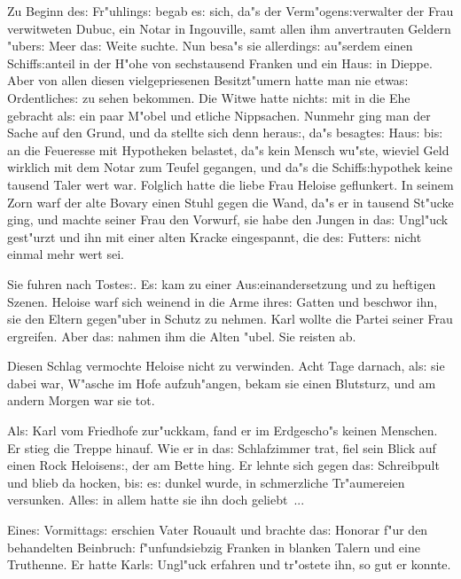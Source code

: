 \documentclass[oneside,12pt]{book}
\newcommand{\s}{s:}%
\begin{document}
Zu Beginn de{\s} Fr"uhling{\s} begab e{\s} sich, da"s der
Verm"ogen{\s}verwalter der Frau verwitweten Dubuc, ein Notar in
Ingouville, samt allen ihm anvertrauten Geldern "uber{\s} Meer
da{\s} Weite suchte. Nun besa"s sie allerding{\s} au"serdem einen
Schiff{\s}anteil in der H"ohe von sechstausend Franken und ein
Hau{\s} in Dieppe. Aber von allen diesen vielgepriesenen
Besitzt"umern hatte man nie etwa{\s} Ordentliche{\s} zu sehen
bekommen. Die Witwe hatte nicht{\s} mit in die Ehe gebracht al{\s}
ein paar M"obel und etliche Nippsachen. Nunmehr ging man der Sache
auf den Grund, und da stellte sich denn herau{\s}, da"s
besagte{\s} Hau{\s} bi{\s} an die Feueresse mit Hypotheken
belastet, da"s kein Mensch wu"ste, wieviel Geld wirklich mit dem
Notar zum Teufel gegangen, und da"s die Schiff{\s}hypothek keine
tausend Taler wert war. Folglich hatte die liebe Frau Heloise
geflunkert. In seinem Zorn warf der alte Bovary einen Stuhl gegen
die Wand, da"s er in tausend St"ucke ging, und machte seiner Frau
den Vorwurf, sie habe den Jungen in da{\s} Ungl"uck gest"urzt und
ihn mit einer alten Kracke eingespannt, die de{\s} Futter{\s}
nicht einmal mehr wert sei.

Sie fuhren nach Toste{\s}. E{\s} kam zu einer Au{\s}einandersetzung
und zu heftigen Szenen. Heloise warf sich weinend in die Arme
ihre{\s} Gatten und beschwor ihn, sie den Eltern gegen"uber in
Schutz zu nehmen. Karl wollte die Partei seiner Frau ergreifen.
Aber da{\s} nahmen ihm die Alten "ubel. Sie reisten ab.

Diesen Schlag vermochte Heloise nicht zu verwinden. Acht Tage
darnach, al{\s} sie dabei war, W"asche im Hofe aufzuh"angen, bekam
sie einen Blutsturz, und am andern Morgen war sie tot.

Al{\s} Karl vom Friedhofe zur"uckkam, fand er im Erdgescho"s
keinen Menschen. Er stieg die Treppe hinauf. Wie er in da{\s}
Schlafzimmer trat, fiel sein Blick auf einen Rock Heloisen{\s},
der am Bette hing. Er lehnte sich gegen da{\s} Schreibpult und
blieb da hocken, bi{\s} e{\s} dunkel wurde, in schmerzliche
Tr"aumereien versunken. Alle{\s} in allem hatte sie ihn doch
geliebt~...



\newpage\begin{center}
{\large \so{Dritte{\s} Kapitel}}\bigskip\bigskip
\end{center}

Eine{\s} Vormittag{\s} erschien Vater Rouault und brachte da{\s}
Honorar f"ur den behandelten Beinbruch: f"unfundsiebzig Franken in
blanken Talern und eine Truthenne. Er hatte Karl{\s} Ungl"uck
erfahren und tr"ostete ihn, so gut er konnte.
\end{document}
